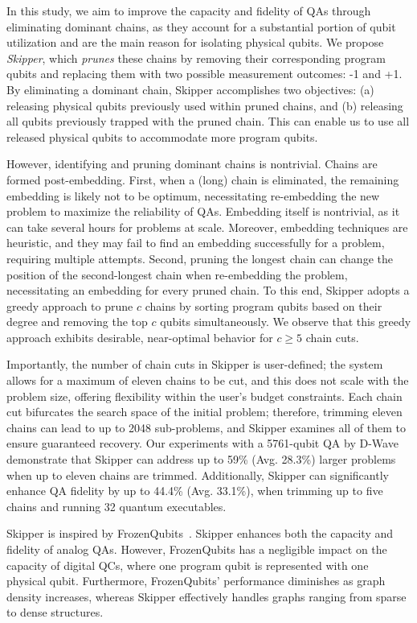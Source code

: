 In this study, we aim to improve the capacity and fidelity of QAs through  eliminating dominant chains, as they account for a substantial portion of qubit utilization and are the main reason for isolating physical qubits.
We propose \emph{Skipper}, which \emph{prunes} these chains by removing their corresponding program qubits and replacing them with two possible measurement outcomes: -1 and +1.
By eliminating a dominant chain, Skipper accomplishes two objectives: 
(a) releasing physical qubits previously used within pruned chains, 
and (b) releasing all qubits previously trapped with the pruned chain. 
This can enable us to use all released physical qubits to accommodate more program qubits. 

However, identifying and pruning dominant chains is nontrivial. 
Chains are formed post-embedding. 
First, when a (long) chain is eliminated, the remaining embedding is likely not to be optimum, necessitating re-embedding the new problem to maximize the reliability of QAs. 
Embedding itself is nontrivial, as it can take several hours for problems at scale. 
Moreover, embedding techniques are heuristic, and they may fail to find an embedding successfully for a problem, requiring multiple attempts. 
Second, pruning the longest chain can change the position of the second-longest chain when re-embedding the problem, necessitating an embedding for every pruned chain. 
To this end, Skipper adopts a greedy approach to prune $c$ chains by sorting program qubits based on their degree and removing the top $c$ qubits simultaneously. 
We observe that this greedy approach exhibits desirable, near-optimal behavior for $c \ge 5$ chain cuts.


Importantly, the number of chain cuts in Skipper is user-defined; the system allows for a maximum of eleven chains to be cut, and this does not scale with the problem size, offering flexibility within the user's budget constraints. 
Each chain cut bifurcates the search space of the initial problem; therefore, trimming eleven chains can lead to up to 2048 sub-problems, and Skipper examines all of them to ensure guaranteed recovery.
Our experiments with a 5761-qubit QA by D-Wave demonstrate that Skipper can address up to 59\% (Avg. 28.3\%) larger problems when up to eleven chains are trimmed. 
Additionally, Skipper can significantly enhance QA fidelity by up to 44.4\% (Avg. 33.1\%), when trimming up to five chains and running 32 quantum executables.


Skipper is inspired by FrozenQubits~\cite{ayanzadeh2023frozenqubits}.
Skipper enhances both the capacity and fidelity of analog QAs. 
However, FrozenQubits has a negligible impact on the capacity of digital QCs, where one program qubit is represented with one physical qubit. 
Furthermore, FrozenQubits' performance diminishes as graph density increases, whereas Skipper effectively handles graphs ranging from sparse to dense structures.

